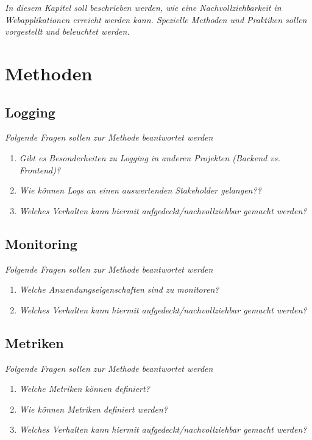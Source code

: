 
\textit{In diesem Kapitel soll beschrieben werden, wie eine Nachvollziehbarkeit in Webapplikationen erreicht werden kann. Spezielle Methoden und Praktiken sollen vorgestellt und beleuchtet werden.}

\section{Methoden}

\subsection{Logging}

\textit{Folgende Fragen sollen zur Methode beantwortet werden}
\begin{enumerate}
	\item \textit{Gibt es Besonderheiten zu Logging in anderen Projekten (Backend vs. Frontend)?}
	\item \textit{Wie können Logs an einen auswertenden Stakeholder gelangen??}
	\item \textit{Welches Verhalten kann hiermit aufgedeckt/nachvollziehbar gemacht werden?}
\end{enumerate}

\subsection{Monitoring}

\textit{Folgende Fragen sollen zur Methode beantwortet werden}
\begin{enumerate}
	\item \textit{Welche Anwendungseigenschaften sind zu monitoren?}
	\item \textit{Welches Verhalten kann hiermit aufgedeckt/nachvollziehbar gemacht werden?}
\end{enumerate}

\subsection{Metriken}

\textit{Folgende Fragen sollen zur Methode beantwortet werden}
\begin{enumerate}
	\item \textit{Welche Metriken können definiert?}
	\item \textit{Wie können Metriken definiert werden?}
	\item \textit{Welches Verhalten kann hiermit aufgedeckt/nachvollziehbar gemacht werden?}
\end{enumerate}

